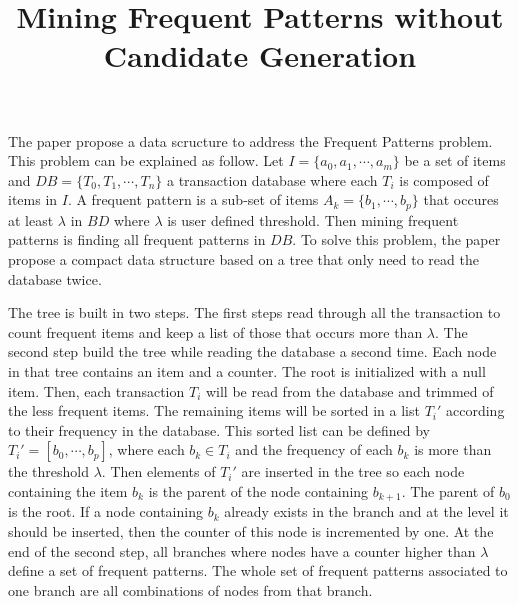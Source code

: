 \documentclass{article}
\title{Mining Frequent Patterns without Candidate Generation}
\begin{document}
\maketitle
The paper propose a data scructure to address the Frequent Patterns problem.
This problem can be explained as follow.
Let $I = \{a_0, a_1, \cdots, a_m\}$ be a set of items and $DB = \{T_0, T_1, \cdots, T_n\}$ a transaction database where each $T_i$ is composed of items in $I$.
A frequent pattern is a sub-set of items $A_k = \{b_1, \cdots, b_p\}$ that occures at least $\lambda$ in $BD$ where $\lambda$ is user defined threshold.
Then mining frequent patterns is finding all frequent patterns in $DB$.
To solve this problem, the paper propose a compact data structure based on a tree that only need to read the database twice.

The tree is built in two steps.
The first steps read through all the transaction to count frequent items and keep a list of those that occurs more than $\lambda$.
The second step build the tree while reading the database a second time.
Each node in that tree contains an item and a counter.
The root is initialized with a null item.
Then, each transaction $T_i$ will be read from the database and trimmed of the less frequent items.
The remaining items will be sorted in a list $T_i'$ according to their frequency in the database.
This sorted list can be defined by $T_i' = [b_0, \cdots, b_p]$, where each $b_k \in T_i$ and the frequency of each $b_k$
is more than the threshold $\lambda$.
Then elements of $T_i'$ are inserted in the tree so each node containing the item $b_k$ is the parent of the node containing $b_{k+1}$.
The parent of $b_0$ is the root.
If a node containing $b_k$ already exists in the branch and at the level it should be inserted, then the counter of this node is incremented by one. 
At the end of the second step, all branches where nodes have a counter higher than $\lambda$ define a set of frequent patterns.
The whole set of frequent patterns associated to one branch are all combinations of nodes from that branch.
\end{document}
